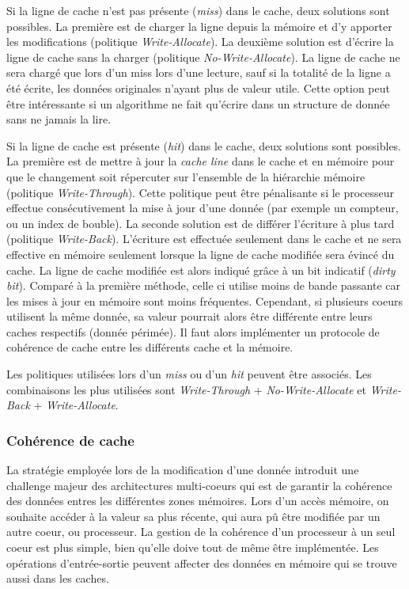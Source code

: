 Si la ligne de cache n'est pas présente (\textit{miss}) dans le cache, deux solutions sont possibles. La première est de charger la ligne depuis la mémoire et d'y apporter les modifications (politique \textit{Write-Allocate}). La deuxième solution est d'écrire la ligne de cache sans la charger (politique \textit{No-Write-Allocate}). La ligne de cache ne sera chargé que lors d'un miss lors d'une lecture, sauf si la totalité de la ligne a été écrite, les données originales n'ayant plus de valeur utile. Cette option peut être intéressante si un algorithme ne fait qu'écrire dans un structure de donnée sans ne jamais la lire.

Si la ligne de cache est présente (\textit{hit}) dans le cache, deux solutions sont possibles. La première est de mettre à jour la \textit{cache line} dans le cache et en mémoire pour que le changement soit répercuter sur l'ensemble de la hiérarchie mémoire (politique \textit{Write-Through}). Cette politique peut être pénalisante si le processeur effectue consécutivement la mise à jour d'une donnée (par exemple un compteur, ou un index de bouble).  La seconde solution est de différer l'écriture à plus tard (politique \textit{Write-Back}). L'écriture est effectuée seulement dans le cache et ne sera effective en mémoire seulement lorsque la ligne de cache modifiée sera évincé du cache. La ligne de cache modifiée est alors indiqué grâce à un bit indicatif (\textit{dirty bit}). Comparé à la première méthode, celle ci utilise moins de bande passante car les mises à jour en mémoire sont moins fréquentes. Cependant, si plusieurs coeurs utilisent la même donnée, sa valeur pourrait alors être différente entre leurs caches respectifs (donnée périmée). Il faut alors implémenter un protocole de cohérence de cache entre les différents cache et la mémoire.

Les politiques utilisées lors d'un \textit{miss} ou d'un \textit{hit} peuvent être associés. Les combinaisons les plus utilisées sont \textit{Write-Through} + \textit{No-Write-Allocate} et \textit{Write-Back} + \textit{Write-Allocate}.






\subsubsection{Cohérence de cache} \label{sec:cache_coherence}

La stratégie employée lors de la modification d'une donnée introduit une challenge majeur des architectures multi-coeurs qui est de garantir la cohérence des données entres les différentes zones mémoires. Lors d'un accès mémoire, on souhaite accéder à la valeur sa plus récente, qui aura pû être modifiée par un autre coeur, ou processeur. La gestion de la cohérence d'un processeur à un seul coeur est plus simple, bien qu'elle doive tout de même être implémentée. Les opérations d'entrée-sortie peuvent affecter des données en mémoire qui se trouve aussi dans les caches.

